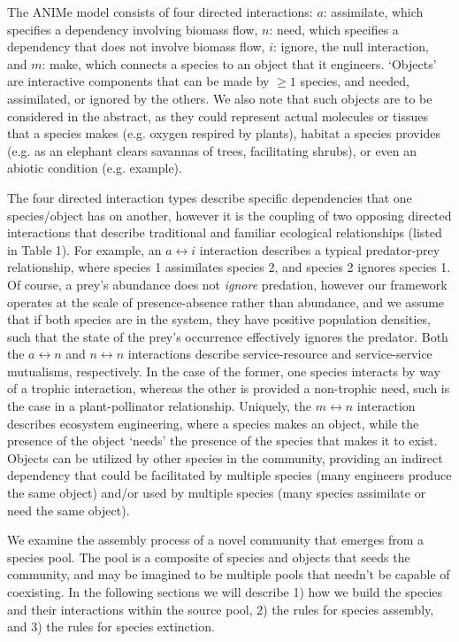 \documentclass[twocolumn,preprintnumbers,amsmath,amssymb,superscriptaddress]{revtex4}
\begin{document}

The ANIMe model consists of four directed interactions:
$a$: assimilate, which specifies a dependency involving biomass flow,
$n$: need, which specifies a dependency that does not involve biomass flow,
$i$: ignore, the null interaction, and
$m$: make, which connects a species to an object that it engineers. 
`Objects' are interactive components that can be made by $\geq 1$ species, and needed, assimilated, or ignored by the others.
We also note that such objects are to be considered in the abstract, as they could represent actual molecules or tissues that a species makes (e.g. oxygen respired by plants), habitat a species provides (e.g. as an elephant clears savannas of trees, facilitating shrubs), or even an abiotic condition (e.g. example). 

The four directed interaction types describe specific dependencies that one species/object has on another, however it is the coupling of two opposing directed interactions that describe traditional and familiar ecological relationships (listed in Table 1).
For example, an $a \leftrightarrow i$ interaction describes a typical predator-prey relationship, where species 1 assimilates species 2, and species 2 ignores species 1.
Of course, a prey's abundance does not \emph{ignore} predation, however our framework operates at the scale of presence-absence rather than abundance, and we assume that if both species are in the system, they have positive population densities, such that the state of the prey's occurrence effectively ignores the predator.
Both the $a \leftrightarrow n$ and $n \leftrightarrow n$ interactions describe service-resource and service-service mutualisms, respectively.
In the case of the former, one species interacts by way of a trophic interaction, whereas the other is provided a non-trophic need, such is the case in a plant-pollinator relationship.
Uniquely, the $m \leftrightarrow n$ interaction describes ecosystem engineering, where a species makes an object, while the presence of the object `needs' the presence of the species that makes it to exist.
Objects can be utilized by other species in the community, providing an indirect dependency that could be facilitated by multiple species (many engineers produce the same object) and/or used by multiple species (many species assimilate or need the same object).

We examine the assembly process of a novel community that emerges from a species pool.
The pool is a composite of species and objects that seeds the community, and may be imagined to be multiple pools that needn't be capable of coexisting.
In the following sections we will describe
1) how we build the species and their interactions within the source pool,
2) the rules for species assembly, and 
3) the rules for species extinction.
\end{document}
